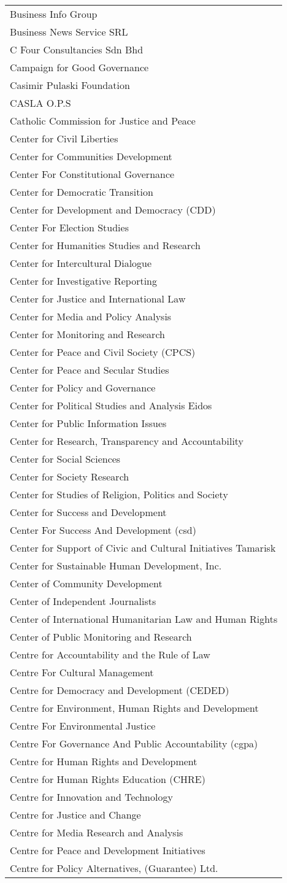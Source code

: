 \begin{longtable}[]{@{}l@{}}
Business Info Group\tabularnewline
Business News Service SRL\tabularnewline
C Four Consultancies Sdn Bhd\tabularnewline
Campaign for Good Governance\tabularnewline
Casimir Pulaski Foundation\tabularnewline
CASLA O.P.S\tabularnewline
Catholic Commission for Justice and Peace\tabularnewline
Center for Civil Liberties\tabularnewline
Center for Communities Development\tabularnewline
Center For Constitutional Governance\tabularnewline
Center for Democratic Transition\tabularnewline
Center for Development and Democracy (CDD)\tabularnewline
Center For Election Studies\tabularnewline
Center for Humanities Studies and Research\tabularnewline
Center for Intercultural Dialogue\tabularnewline
Center for Investigative Reporting\tabularnewline
Center for Justice and International Law\tabularnewline
Center for Media and Policy Analysis\tabularnewline
Center for Monitoring and Research\tabularnewline
Center for Peace and Civil Society (CPCS)\tabularnewline
Center for Peace and Secular Studies\tabularnewline
Center for Policy and Governance\tabularnewline
Center for Political Studies and Analysis Eidos\tabularnewline
Center for Public Information Issues\tabularnewline
Center for Research, Transparency and Accountability\tabularnewline
Center for Social Sciences\tabularnewline
Center for Society Research\tabularnewline
Center for Studies of Religion, Politics and Society\tabularnewline
Center for Success and Development\tabularnewline
Center For Success And Development (csd)\tabularnewline
Center for Support of Civic and Cultural Initiatives
Tamarisk\tabularnewline
Center for Sustainable Human Development, Inc.\tabularnewline
Center of Community Development\tabularnewline
Center of Independent Journalists\tabularnewline
Center of International Humanitarian Law and Human Rights\tabularnewline
Center of Public Monitoring and Research\tabularnewline
Centre for Accountability and the Rule of Law\tabularnewline
Centre For Cultural Management\tabularnewline
Centre for Democracy and Development (CEDED)\tabularnewline
Centre for Environment, Human Rights and Development\tabularnewline
Centre For Environmental Justice\tabularnewline
Centre For Governance And Public Accountability (cgpa)\tabularnewline
Centre for Human Rights and Development\tabularnewline
Centre for Human Rights Education (CHRE)\tabularnewline
Centre for Innovation and Technology\tabularnewline
Centre for Justice and Change\tabularnewline
Centre for Media Research and Analysis\tabularnewline
Centre for Peace and Development Initiatives\tabularnewline
Centre for Policy Alternatives, (Guarantee) Ltd.\tabularnewline

\end{longtable}
